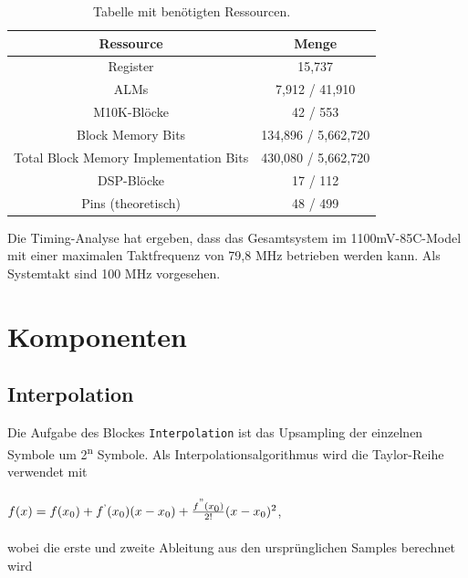 \begin{table}[H]
\centering
\begin{tabular}{|c|c|}
\hline
\textbf{Ressource} & \textbf{Menge} \\ \hline
Register & 15,737 \\ \hline
ALMs & 7,912 / 41,910 \\ \hline
M10K-Blöcke & 42 / 553 \\ \hline
Block Memory Bits & 134,896 / 5,662,720 \\ \hline
Total Block Memory Implementation Bits & 430,080 / 5,662,720 \\ \hline
DSP-Blöcke & 17 / 112 \\ \hline
Pins (theoretisch) & 48 / 499 \\ \hline
\end{tabular}
\caption{Tabelle mit benötigten Ressourcen.}
\label{tab:resources_coarse}
\end{table}

Die Timing-Analyse hat ergeben, dass das Gesamtsystem im 1100mV-85C-Model mit einer maximalen Taktfrequenz von 79,8 MHz betrieben werden kann. Als Systemtakt sind 100 MHz vorgesehen.

\section{Komponenten}

\subsection{Interpolation}
Die Aufgabe des Blockes \texttt{Interpolation} ist das Upsampling der einzelnen Symbole um 2\textsuperscript{n} Symbole. Als Interpolationsalgorithmus wird die Taylor-Reihe verwendet mit
\\
\\

$ f(x)=f(x\textsubscript{0}	) +f\textsuperscript{'} (x\textsubscript{0}) (x-x\textsubscript{0})+\frac{f\textsuperscript{''}(x\textsubscript{0})}{2!}(x-x\textsubscript{0})\textsuperscript{2} $,
\\
\\

\noindent wobei die erste und zweite Ableitung aus den ursprünglichen Samples berechnet wird



